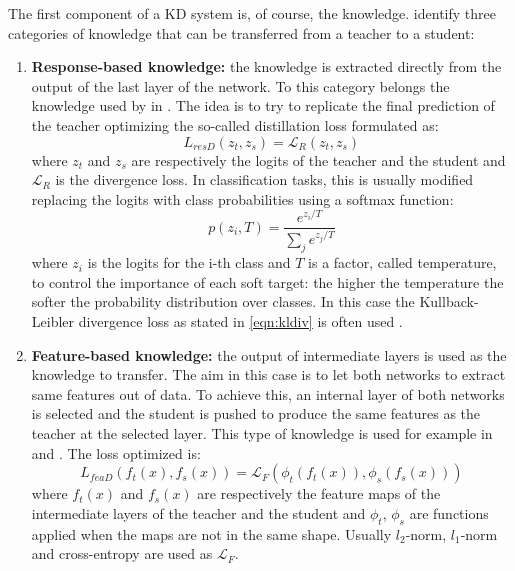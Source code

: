 The first component of a KD system is, of course, the knowledge.
\citeauthor{gou2021knowledge} \cite{gou2021knowledge} identify three categories of knowledge that can be transferred from a teacher to a student:
\begin{enumerate}
    \item \textbf{Response-based knowledge:} the knowledge is extracted directly from the output of the last layer of the network.
    To this category belongs the knowledge used by \citeauthor{hinton2015distilling} in \cite{hinton2015distilling}.
    The idea is to try to replicate the final prediction of the teacher optimizing the so-called distillation loss formulated as:
    \begin{equation}
        L_{resD}(z_t, z_s) = \mathcal{L}_R(z_t, z_s)
        \label{eqn:response_based_kd_loss}
    \end{equation}
    where $z_t$ and $z_s$ are respectively the logits of the teacher and the student and $\mathcal{L}_R$ is the divergence loss.
    In classification tasks, this is usually modified replacing the logits with class probabilities using a softmax function:
    \begin{equation}
        p(z_i, T) = \frac{e^{z_i/T}}{\sum_je^{z_j/T}}
        \label{eqn:softmax}
    \end{equation}
    where $z_i$ is the logits for the i-th class and $T$ is a factor, called temperature, to control the importance of each soft target: the higher the temperature the softer the probability distribution over classes.
    In this case the Kullback-Leibler divergence loss as stated in \ref{eqn:kldiv} is often used \cite{gou2021knowledge}.
    
    \item \textbf{Feature-based knowledge:} the output of intermediate layers is used as the knowledge to transfer.
    The aim in this case is to let both networks to extract same features out of data.
    To achieve this, an internal layer of both networks is selected and the student is pushed to produce the same features as the teacher at the selected layer.
    This type of knowledge is used for example in \cite{romero2014fitnets} and \cite{fini2022self}.
    The loss optimized is:
    \begin{equation}
        L_{feaD}(f_t(x), f_s(x)) = \mathcal{L}_F(\phi_t(f_t(x)), \phi_s(f_s(x)))
        \label{eqn:feature_based_kd_loss}
    \end{equation}
    where $f_t(x)$ and $f_s(x)$ are respectively the feature maps of the intermediate layers of the teacher and the student and $\phi_t$, $\phi_s$ are functions applied when the maps are not in the same shape.
    Usually $l_2$-norm, $l_1$-norm and cross-entropy are used as $\mathcal{L}_F$.
    

\end{enumerate}
